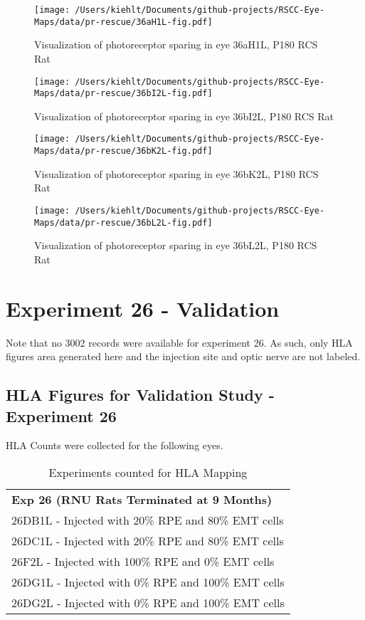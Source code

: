 \documentclass{article}
\begin{document}
\begin{center}
\begin{figure}
\texttt{[image: /Users/kiehlt/Documents/github-projects/RSCC-Eye-Maps/data/pr-rescue/36aH1L-fig.pdf]}
\caption{Visualization of photoreceptor sparing in eye 36aH1L, P180 RCS Rat}
\label{fig:36aH1L}
\end{figure}

\end{center}
\begin{center}
\begin{figure}
\texttt{[image: /Users/kiehlt/Documents/github-projects/RSCC-Eye-Maps/data/pr-rescue/36bI2L-fig.pdf]}
\caption{Visualization of photoreceptor sparing in eye 36bI2L, P180 RCS Rat}
\label{fig:36bI2L}
\end{figure}

\end{center}
\begin{center}
\begin{figure}
\texttt{[image: /Users/kiehlt/Documents/github-projects/RSCC-Eye-Maps/data/pr-rescue/36bK2L-fig.pdf]}
\caption{Visualization of photoreceptor sparing in eye 36bK2L, P180 RCS Rat}
\label{fig:36bK2L}
\end{figure}

\end{center}
\begin{center}
\begin{figure}
\texttt{[image: /Users/kiehlt/Documents/github-projects/RSCC-Eye-Maps/data/pr-rescue/36bL2L-fig.pdf]}
\caption{Visualization of photoreceptor sparing in eye 36bL2L, P180 RCS Rat}
\label{fig:36bL2L}
\end{figure}

\end{center}\newpage

\section{Experiment 26 - Validation}
Note that no 3002 records were available for experiment 26. As such, only HLA figures area generated here and the injection site and optic nerve are not labeled.
\subsection{HLA Figures for Validation Study - Experiment 26}
HLA Counts were collected for the following eyes.
\begin{table}[]
\centering
\begin{tabular}{l}
\textbf{Exp 26 (RNU Rats Terminated at 9 Months) } \\
26DB1L -  Injected with 20\% RPE and 80\% EMT cells \\
26DC1L - Injected with 20\% RPE and 80\% EMT cells \\
26F2L - Injected with 100\% RPE and 0\% EMT cells \\
26DG1L -  Injected with 0\% RPE and 100\% EMT cells  \\
26DG2L -  Injected with 0\% RPE and 100\% EMT cells\\
\end{tabular}
\caption{Experiments counted for HLA Mapping}
\end{table}
\end{document}
